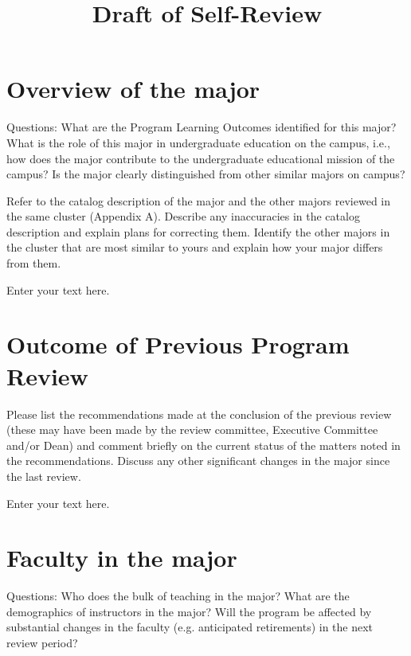 \documentclass[12pt]{article}
\begin{document}


\title{Draft of Self-Review}

\maketitle

\section{Overview of the major}

Questions: What are the Program Learning Outcomes identified for this major? What is the role of this major in undergraduate education on the campus, i.e., how does the major contribute to the undergraduate educational mission of the campus? Is the major clearly distinguished from other similar majors on campus?

Refer to the catalog description of the major and the other majors reviewed in the same cluster (Appendix A). Describe any inaccuracies in the catalog description and explain plans for correcting them. Identify the other majors in the cluster that are most similar to yours and explain how your major differs from them.

Enter your text here.

\section{Outcome of Previous Program Review}
Please list the recommendations made at the conclusion of the previous review (these may have been made by the review committee, Executive Committee and/or Dean) and comment briefly on the current status of the matters noted in the recommendations. Discuss any other significant changes in the major since the last review.

Enter your text here.


\section{Faculty in the major}
Questions: Who does the bulk of teaching in the major? What are the demographics of instructors in the major? Will the program be affected by substantial changes in the faculty (e.g. anticipated retirements) in the next review period?
\end{document}
